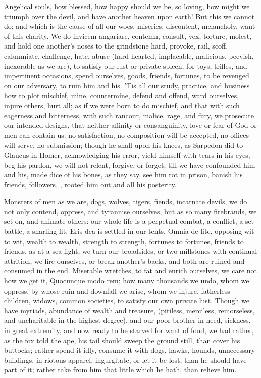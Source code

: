 {Angelical souls, how blessed, how happy should we be, so loving, how
might we triumph over the devil, and have another heaven upon earth!
But this we cannot do; and which is the cause of all our woes,
miseries, discontent, melancholy, want of this charity. We do
invicem angariare, contemn, consult, vex, torture, molest, and hold one
another's noses to the grindstone hard, provoke, rail, scoff,
calumniate, challenge, hate, abuse (hard-hearted, implacable,
malicious, peevish, inexorable as we are), to satisfy our lust or
private spleen, for toys, trifles, and impertinent occasions,
spend ourselves, goods, friends, fortunes, to be revenged on our
adversary, to ruin him and his. 'Tis all our study, practice, and
business how to plot mischief, mine, countermine, defend and offend,
ward ourselves, injure others, hurt all; as if we were born to do
mischief, and that with such eagerness and bitterness, with such
rancour, malice, rage, and fury, we prosecute our intended designs,
that neither affinity or consanguinity, love or fear of God or men can
contain us: no satisfaction, no composition will be accepted, no
offices will serve, no submission; though he shall upon his knees, as
Sarpedon did to Glaucus in Homer, acknowledging his error, yield
himself with tears in his eyes, beg his pardon, we will not relent,
forgive, or forget, till we have confounded him and his, made dice of
his bones, as they say, see him rot in prison, banish his friends,
followers, , rooted him out and all his posterity.

Monsters of men as we are, dogs, wolves, tigers, fiends,
incarnate devils, we do not only contend, oppress, and tyrannise
ourselves, but as so many firebrands, we set on, and animate others:
our whole life is a perpetual combat, a conflict, a set battle, a
snarling fit. Eris dea is settled in our tents, Omnia de lite,
opposing wit to wit, wealth to wealth, strength to strength, fortunes
to fortunes, friends to friends, as at a sea-fight, we turn our
broadsides, or two millstones with continual attrition, we fire
ourselves, or break another's backs, and both are ruined and consumed
in the end. Miserable wretches, to fat and enrich ourselves, we care
not how we get it, Quocunque modo rem; how many thousands we undo, whom
we oppress, by whose ruin and downfall we arise, whom we injure,
fatherless children, widows, common societies, to satisfy our own
private lust. Though we have myriads, abundance of wealth and treasure,
(pitiless, merciless, remorseless, and uncharitable in the highest
degree), and our poor brother in need, sickness, in great extremity,
and now ready to be starved for want of food, we had rather, as the fox
told the ape, his tail should sweep the ground still, than cover his
buttocks; rather spend it idly, consume it with dogs, hawks, hounds,
unnecessary buildings, in riotous apparel, ingurgitate, or let it be
lost, than he should have part of it; rather take from him that
little which he hath, than relieve him.

}
